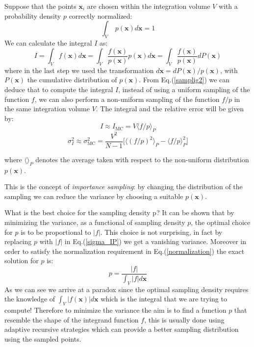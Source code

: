 \documentclass[../main/main.tex]{subfiles}
\begin{document}
Suppose that the points $\textbf{x}_i$ are chosen within the integration volume $V$ with a probability density $p$ correctly normalized:
\begin{equation}
	\label{normalization}
	\int_{V} \;  p(\textbf{x})  d \textbf{x}  = 1
\end{equation}
We can calculate the integral $I$ as:
\begin{equation}
	\label{samplig2}
	I = \int_{V}   f(\textbf{x})  d \textbf{x}  =\int_{V}   \frac{f(\textbf{x})}{ p(\textbf{x})} p(\textbf{x})  d\textbf{x}
	= \int_{V}  \frac{f(\textbf{x})}{ p(\textbf{x})} dP(\textbf{x})
\end{equation}
where in the last step we used the transformation $d\textbf{x} = dP(\textbf{x})/p(\textbf{x}) $, with $P(\textbf{x})$ the 
cumulative distribution of  $p(\textbf{x}) $.
\newline
From Eq.(\ref{samplig2}) we can deduce that to compute the integral $I$, instead of using a uniform sampling of the function $f$,
we can also perform a non-uniform sampling of the function $f/p$ in the same integration volume $V$.
\newline
The integral and the relative error will be given by:
\begin{equation}
	I \approx I_{\text{MC}}  = V \langle f/p \rangle_P
\end{equation}
\begin{equation}
	\label{sigma_IP}
	\sigma^2_I \approx \sigma^2_\text{MC} = \frac{V^2}{N-1} \bigg[\langle (f/p)^2 \rangle_P - \langle f/p \rangle^2_P \bigg]
\end{equation}


where $\langle \rangle_P$ denotes the average taken with respect to the non-uniform distribution $p(\textbf{x})$.

This is the concept of \emph{importance sampling}: by changing the distribution of the sampling we can reduce the variance by choosing
a suitable $p(\textbf{x})$.

What is the best choice for the sampling density p?
It can be shown that by minimizing the variance, as a functional of sampling density $p$, the optimal choice for $p$ is to be proportional 
to $|f|$. This choice is not surprising, in fact by replacing $p$ with $|f|$ in Eq.(\ref{sigma_IP}) we get a vanishing variance.
Moreover in order to satisfy the normalization requirement in Eq.(\ref{normalization}) the exact solution for $p$ is:
\begin{equation}
	p = \frac{|f|}{\int_V |f| d\textbf{x}}
\end{equation}
\newline
As we can see we arrive at a paradox since the optimal sampling density requires the knowledge of $\int_V |f(\textbf{x})| d\textbf{x}$ which is the integral that we are trying to compute!
\newline
Therefore to minimize the variance the aim is to find a function $p$ that resemble the shape of the integrand function $f$, this is usually done 
using adaptive recursive strategies which can provide a better sampling distribution using the sampled points.
\end{document}
